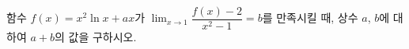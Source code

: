 함수 $f(x)=x^2\ln x+ax$가 $\displaystyle\lim_{x\to 1}\dfrac{f(x)-2}{x^2-1}=b$를 만족시킬 때, 상수 $a$, $b$에 대하여 $a+b$의 값을 구하시오.
